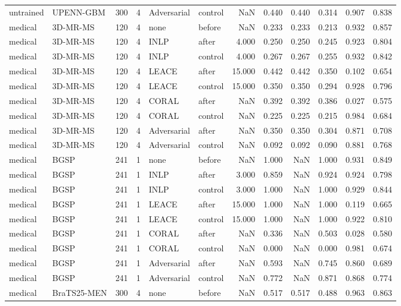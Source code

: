 \begin{tabular}{llrrllrrrrrr}
untrained & UPENN-GBM & 300 & 4 & Adversarial & control & NaN & 0.440 & 0.440 & 0.314 & 0.907 & 0.838 \\
medical & 3D-MR-MS & 120 & 4 & none & before & NaN & 0.233 & 0.233 & 0.213 & 0.932 & 0.857 \\
medical & 3D-MR-MS & 120 & 4 & INLP & after & 4.000 & 0.250 & 0.250 & 0.245 & 0.923 & 0.804 \\
medical & 3D-MR-MS & 120 & 4 & INLP & control & 4.000 & 0.267 & 0.267 & 0.255 & 0.932 & 0.842 \\
medical & 3D-MR-MS & 120 & 4 & LEACE & after & 15.000 & 0.442 & 0.442 & 0.350 & 0.102 & 0.654 \\
medical & 3D-MR-MS & 120 & 4 & LEACE & control & 15.000 & 0.350 & 0.350 & 0.294 & 0.928 & 0.796 \\
medical & 3D-MR-MS & 120 & 4 & CORAL & after & NaN & 0.392 & 0.392 & 0.386 & 0.027 & 0.575 \\
medical & 3D-MR-MS & 120 & 4 & CORAL & control & NaN & 0.225 & 0.225 & 0.215 & 0.984 & 0.684 \\
medical & 3D-MR-MS & 120 & 4 & Adversarial & after & NaN & 0.350 & 0.350 & 0.304 & 0.871 & 0.708 \\
medical & 3D-MR-MS & 120 & 4 & Adversarial & control & NaN & 0.092 & 0.092 & 0.090 & 0.881 & 0.768 \\
medical & BGSP & 241 & 1 & none & before & NaN & 1.000 & NaN & 1.000 & 0.931 & 0.849 \\
medical & BGSP & 241 & 1 & INLP & after & 3.000 & 0.859 & NaN & 0.924 & 0.924 & 0.798 \\
medical & BGSP & 241 & 1 & INLP & control & 3.000 & 1.000 & NaN & 1.000 & 0.929 & 0.844 \\
medical & BGSP & 241 & 1 & LEACE & after & 15.000 & 1.000 & NaN & 1.000 & 0.119 & 0.665 \\
medical & BGSP & 241 & 1 & LEACE & control & 15.000 & 1.000 & NaN & 1.000 & 0.922 & 0.810 \\
medical & BGSP & 241 & 1 & CORAL & after & NaN & 0.336 & NaN & 0.503 & 0.028 & 0.580 \\
medical & BGSP & 241 & 1 & CORAL & control & NaN & 0.000 & NaN & 0.000 & 0.981 & 0.674 \\
medical & BGSP & 241 & 1 & Adversarial & after & NaN & 0.593 & NaN & 0.745 & 0.860 & 0.689 \\
medical & BGSP & 241 & 1 & Adversarial & control & NaN & 0.772 & NaN & 0.871 & 0.868 & 0.774 \\
medical & BraTS25-MEN & 300 & 4 & none & before & NaN & 0.517 & 0.517 & 0.488 & 0.963 & 0.863 \\

\end{tabular}
